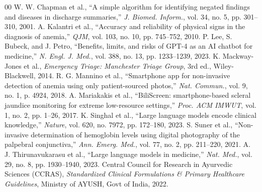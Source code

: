 \documentclass[conference]{IEEEtran}
\begin{document}
\begin{thebibliography}{00}
 W. W. Chapman et al., ``A simple algorithm for identifying negated findings and diseases in discharge summaries,'' \textit{J. Biomed. Inform.}, vol. 34, no. 5, pp. 301--310, 2001.
 A. Kalantri et al., ``Accuracy and reliability of physical signs in the diagnosis of anemia,'' \textit{QJM}, vol. 103, no. 10, pp. 745--752, 2010.
 P. Lee, S. Bubeck, and J. Petro, ``Benefits, limits, and risks of GPT-4 as an AI chatbot for medicine,'' \textit{N. Engl. J. Med.}, vol. 388, no. 13, pp. 1233--1239, 2023.
 K. Mackway-Jones et al., \textit{Emergency Triage: Manchester Triage Group}, 3rd ed., Wiley-Blackwell, 2014.
 R. G. Mannino et al., ``Smartphone app for non-invasive detection of anemia using only patient-sourced photos,'' \textit{Nat. Commun.}, vol. 9, no. 1, p. 4924, 2018.
 A. Mariakakis et al., ``BiliScreen: smartphone-based scleral jaundice monitoring for extreme low-resource settings,'' \textit{Proc. ACM IMWUT}, vol. 1, no. 2, pp. 1--26, 2017.
 K. Singhal et al., ``Large language models encode clinical knowledge,'' \textit{Nature}, vol. 620, no. 7972, pp. 172--180, 2023.
 S. Suner et al., ``Non-invasive determination of hemoglobin levels using digital photography of the palpebral conjunctiva,'' \textit{Ann. Emerg. Med.}, vol. 77, no. 2, pp. 211--220, 2021.
 A. J. Thirunavukarasu et al., ``Large language models in medicine,'' \textit{Nat. Med.}, vol. 29, no. 8, pp. 1930--1940, 2023.
 Central Council for Research in Ayurvedic Sciences (CCRAS), \textit{Standardized Clinical Formulations \& Primary Healthcare Guidelines}, Ministry of AYUSH, Govt of India, 2022.
\end{thebibliography}
\end{document}
